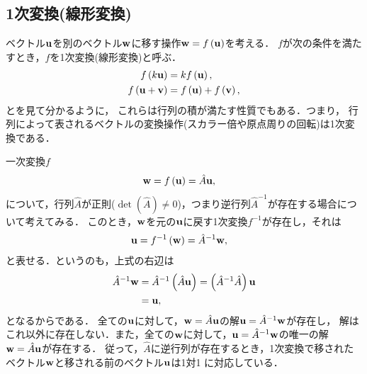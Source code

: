 \subsection{1次変換(線形変換)}
%
ベクトル${\bf u}$を別のベクトル${\bf w}$に移す操作${\bf w}= f\left({\bf u}\right)$を考える．
$f$が次の条件を満たすとき，$f$を1次変換(線形変換)と呼ぶ．
%
\begin{align}
f\left(k{\bf u}\right) & =kf\left({\bf u}\right),\\
f\left({\bf u}+{\bf v}\right) & =f\left({\bf u}\right)+f\left({\bf v}\right),
\end{align}
%
とを見て分かるように，
これらは行列の積が満たす性質でもある．つまり，
行列によって表されるベクトルの変換操作(スカラー倍や原点周りの回転)は1次変換である．

一次変換$f$
\begin{align}
 {\bf w} &= f\left({\bf u}\right)  =\hat{A}{\bf u},
\end{align}
について，行列$\hat{A}$が正則($\det(\hat{A}) \neq 0$)，つまり逆行列$\hat{A}^{-1}$が存在する場合について考えてみる．
このとき，${\bf w}$を元の${\bf u}$に戻す1次変換$f^{-1}$が存在し，それは
\begin{align}
{\bf u} & =f^{-1}\left({\bf w}\right)=\hat{A}^{-1}{\bf w},
\end{align}
と表せる．というのも，上式の右辺は
\begin{align}
\hat{A}^{-1}{\bf w} & =\hat{A}^{-1}\left(\hat{A}{\bf u}\right)=\left(\hat{A}^{-1}\hat{A}\right){\bf u}\notag\\
 & ={\bf u},
\end{align}
となるからである．
全ての${\bf u}$に対して，${\bf w}=\hat{A}{\bf u}$の解${\bf u}=\hat{A}^{-1}{\bf w}$が存在し，
解はこれ以外に存在しない．また，全ての${\bf w}$に対して，${\bf u}=\hat{A}^{-1}{\bf w}$の唯一の解${\bf w}=\hat{A}{\bf u}$が存在する．
従って，$\hat{A}$に逆行列が存在するとき，1次変換で移されたベクトル${\bf w}$と移される前のベクトル${\bf u}$は1対1
に対応している．


%
